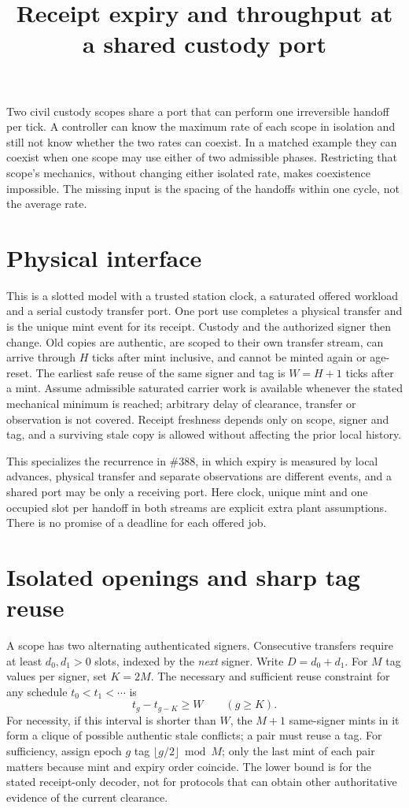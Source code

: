 \documentclass[11pt]{article}
\title{Receipt expiry and throughput at a shared custody port}
\date{}
\begin{document}
\maketitle

Two civil custody scopes share a port that can perform one irreversible
handoff per tick. A controller can know the maximum rate of each scope in
isolation and still not know whether the two rates can coexist. In a
matched example they can coexist when one scope may use either of two
admissible phases. Restricting that scope's mechanics, without changing
either isolated rate, makes coexistence impossible. The missing input is
the spacing of the handoffs within one cycle, not the average rate.

\section{Physical interface}
This is a slotted model with a trusted station clock, a saturated offered
workload and a serial custody transfer port. One port use completes a
physical transfer and is the unique mint event for its receipt. Custody
and the authorized signer then change. Old copies are authentic, are
scoped to their own transfer stream, can arrive through \(H\) ticks
after mint inclusive, and cannot be minted again or age-reset. The
earliest safe reuse of the same signer and tag is \(W=H+1\) ticks
after a mint. Assume admissible saturated carrier work is available
whenever the stated mechanical minimum is reached; arbitrary delay of
clearance, transfer or observation is not covered. Receipt freshness
depends only on scope, signer and tag, and a surviving stale copy is
allowed without affecting the prior local history.

This specializes the recurrence in \#388, in which expiry is measured
by local advances, physical transfer and separate observations are
different events, and a shared port may be only a receiving port. Here
clock, unique mint and one occupied slot per handoff in both streams
are explicit extra plant assumptions. There is no promise of a
deadline for each offered job.

\section{Isolated openings and sharp tag reuse}
A scope has two alternating authenticated signers. Consecutive transfers
require at least \(d_0,d_1>0\) slots, indexed by the \emph{next} signer.
Write \(D=d_0+d_1\). For \(M\) tag values per signer, set \(K=2M\).
The necessary and sufficient reuse constraint for any schedule
\(t_0<t_1<\cdots\) is
\[
       t_g-t_{g-K}\geq W \qquad (g\geq K).
\]
For necessity, if this interval is shorter than \(W\), the \(M+1\)
same-signer mints in it form a clique of possible authentic stale
conflicts; a pair must reuse a tag. For sufficiency, assign epoch \(g\)
tag \(\lfloor g/2\rfloor\bmod M\); only the last mint of each pair
matters because mint and expiry order coincide. The lower bound is
for the stated receipt-only decoder, not for protocols that can obtain
other authoritative evidence of the current clearance.
\end{document}
